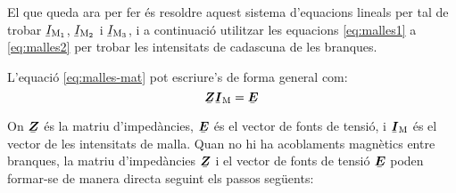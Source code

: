 El que queda ara per fer és resoldre aquest sistema d'equacions lineals per tal de trobar $\cmplx{I}\ped{M_1}$, $\cmplx{I}\ped{M_2}$ i $\cmplx{I}\ped{M_3}$, i a continuació utilitzar les equacions \eqref{eq:malles1} a \eqref{eq:malles2} per trobar les intensitats de cadascuna de les branques.


L'equació \eqref{eq:malles-mat} pot escriure's de forma general com:
\begin{equation}
  \mcmplx{Z} \mcmplx{I}\ped{M} = \mcmplx{E}
\end{equation}

On  $\mcmplx{Z}$ és la matriu d'impedàncies, $\mcmplx{E}$ és el vector de fonts de tensió, i $\mcmplx{I}\ped{M}$ és el vector de les intensitats de malla. Quan no hi ha acoblaments magnètics entre branques, la matriu d'impedàncies $\mcmplx{Z}$ i el vector de fonts de tensió $\mcmplx{E}$ poden formar-se de manera directa seguint els passos següents:
